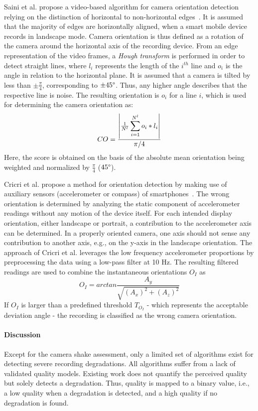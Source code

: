 Saini et al. propose a video-based algorithm for camera orientation detection relying on the distinction of horizontal to non-horizontal edges~\cite{Saini2012}.
It is assumed that the majority of edges are horizontally aligned, when a smart mobile device records in landscape mode.
Camera orientation is thus defined as a rotation of the camera around the horizontal axis of the recording device.
From an edge representation of the video frames, a \textit{Hough transform} is performed in order to detect straight lines, where $l_i$ represents the length of the $i^{th}$ line and $o_i$ is the angle in relation to the horizontal plane. 
It is assumed that a camera is tilted by less than $\pm\frac{\pi}{4}$, corresponding to $\pm45\degree$.
Thus, any higher angle describes that the respective line is noise.
The resulting orientation is $o_i$ for a line $i$, which is used for determining the camera orientation as:
\begin{equation} \label{eq:210_SainiTiltScore}
CO =  \frac{\abs*{\frac{1}{N^l} \displaystyle\sum_{i=1}^{N^l} o_i * l_i} }{\pi/4} 
\end{equation}
Here, the score is obtained on the basis of the absolute mean orientation being weighted and normalized by $\frac{\pi}{4}$ ($45\degree$). 

Cricri et al. propose a method for orientation detection by making use of auxiliary sensors (accelerometer or compass) of smartphones~\cite{Cricri2011}.
The wrong orientation is determined by analyzing the static component of accelerometer readings without any motion of the device itself.
For each intended display orientation, either landscape or portrait, a contribution to the accelerometer axis can be determined.
In a properly oriented camera, one axis should not sense any contribution to another axis, e.g., on the y-axis in the landscape orientation.
The approach of Cricri et al. leverages the low frequency accelerometer proportions by preprocessing the data using a low-pass filter at 10 \unit{Hz}.
The resulting filtered readings are used to combine the instantaneous orientations $O_I$ as 
\begin{equation}
O_I = arctan \frac{A_y}{\sqrt{(A_x)^2 + (A_z)^2}}
\end{equation}
If $O_I$ is larger than a predefined threshold $T_{O_I}$ - which represents the acceptable deviation angle - the recording is classified as the wrong camera orientation.
\paragraph{Discussion}
Except for the camera shake assessment, only a limited set of algorithms exist for detecting severe recording degradations.
All algorithms suffer from a lack of validated quality models.
Existing work does not quantify the perceived quality but solely detects a degradation. 
Thus, quality is mapped to a binary value, i.e., a low quality when a degradation is detected, and a high quality if no degradation is found.

